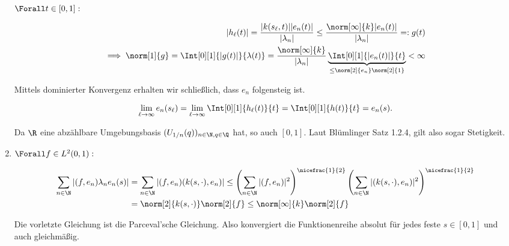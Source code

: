 \begin{solution}
\begin{enumerate}[label = (\alph*)]
  $\Forall t \in [0, 1]:$

  \begin{align*}
    |h_\ell(t)|
    =
    \frac
    {
      |k(s_\ell, t)|
      |e_n(t)|
    }
    {|\lambda_n|}
    \leq
    \frac
    {
      \norm[\infty]{k}
      |e_n(t)|
    }
    {|\lambda_n|}
    =:
    g(t) \\
    \implies
    \norm[1]{g}
    =
    \Int[0][1]
    {|g(t)|}{\lambda(t)}
    =
    \frac
    {\norm[\infty]{k}}
    {|\lambda_n|}
    \underbrace
    {
      \Int[0][1]
      {|e_n(t)|}{t}
    }_{
      \leq
      \norm[2]{e_n}
      \norm[2]{1}
    }
    < \infty
  \end{align*}

  Mittels dominierter Konvergenz
  erhalten wir schließlich, dass $e_n$ folgensteig ist.

  \begin{align*}
    \lim_{\ell \to \infty}
    e_n(s_\ell)
    =
    \lim_{\ell \to \infty}
    \Int[0][1]{h_\ell(t)}{t}
    =
    \Int[0][1]{h(t)}{t}
    =
    e_n(s).
  \end{align*}


  Da $\R$ eine abzählbare Umgebungsbasis $(U_{1/n}(q))_{n \in \N, q \in \Q}$ hat, so auch $[0, 1]$.
  Laut Blümlinger Satz 1.2.4, gilt also sogar Stetigkeit.

  \item
  $\Forall f \in L^2(0, 1):$

  \begin{align*}
    \sum_{n \in \N}
    |(f, e_n)\lambda_n e_n(s)|
     &= \sum_{n \in \N}
     |(f, e_n)(k(s,\cdot),e_n)| \leq
     \left(\sum_{n \in \N}
     |(f, e_n)|^2\right)^{\nicefrac{1}{2}}
     \left(\sum_{n \in \N}|(k(s,\cdot),e_n)|^2\right)^{\nicefrac{1}{2}} \\
    &= \norm[2]{k(s,\cdot)}\norm[2]{f} \leq\norm[\infty]{k}\norm[2]{f}
  \end{align*}

  Die vorletzte Gleichung ist die Parceval'sche Gleichung.
  Also konvergiert die Funktionenreihe absolut für jedes feste $s \in [0,1]$
  und auch gleichmäßig. \\

\end{enumerate}

\end{solution}
